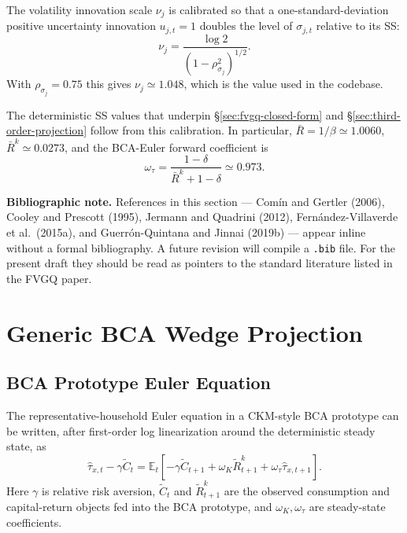 \documentclass[11pt]{article}
\newcommand{\E}{\mathbb{E}}
\theoremstyle{plain}
\theoremstyle{definition}
\begin{document}
The volatility innovation scale $\nu_j$ is calibrated so that a one-standard-deviation
positive uncertainty innovation $u_{j,t}=1$ doubles the level of $\sigma_{j,t}$
relative to its SS:
\begin{equation}
\nu_j = \frac{\log 2}{(1-\rho_{\sigma_j}^2)^{1/2}}.
\tag{Nu-FVGQ}
\end{equation}
With $\rho_{\sigma_j}=0.75$ this gives $\nu_j \simeq 1.048$, which is the value
used in the codebase.

The deterministic SS values that underpin §\ref{sec:fvgq-closed-form} and
§\ref{sec:third-order-projection} follow from this calibration. In particular,
$\bar R = 1/\beta \simeq 1.0060$, $\bar R^k \simeq 0.0273$, and the BCA-Euler
forward coefficient is
\[
\omega_\tau = \frac{1-\delta}{\bar R^k + 1 - \delta} \simeq 0.973.
\]

\medskip

\noindent\textbf{Bibliographic note.} References in this section --- Com\'in
and Gertler (2006), Cooley and Prescott (1995), Jermann and Quadrini (2012),
Fern\'andez-Villaverde et al.\ (2015a), and Guerr\'on-Quintana and Jinnai
(2019b) --- appear inline without a formal bibliography. A future revision
will compile a \texttt{.bib} file. For the present draft they should be read
as pointers to the standard literature listed in the FVGQ paper.

\section{Generic BCA Wedge Projection}
\label{sec:generic-projection}

\subsection{BCA Prototype Euler Equation}

The representative-household Euler equation in a CKM-style BCA prototype can be
written, after first-order log linearization around the deterministic steady
state, as
\begin{equation}
\hat\tau_{x,t}-\gamma\tilde C_t
=
\E_t\!\left[
-\gamma\tilde C_{t+1}
+\omega_K\tilde R^k_{t+1}
+\omega_\tau\hat\tau_{x,t+1}
\right].
\tag{BCA-E}
\end{equation}
Here $\gamma$ is relative risk aversion, $\tilde C_t$ and
$\tilde R^k_{t+1}$ are the observed consumption and capital-return objects
fed into the BCA prototype, and $\omega_K,\omega_\tau$ are steady-state
coefficients.
\end{document}

